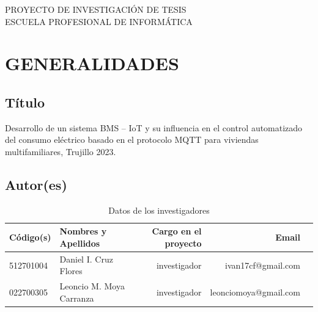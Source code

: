 \documentclass[a4paper, 12pt]{article}
\begin{document}
\begin{center}
\Large {PROYECTO DE INVESTIGACIÓN DE TESIS \\
\vskip 0.2cm
 ESCUELA PROFESIONAL DE INFORMÁTICA}
\end{center}
\vskip 1cm

\section{GENERALIDADES}



\subsection{Título}
Desarrollo de un sistema BMS – IoT y su influencia en el control automatizado del consumo eléctrico basado en el protocolo MQTT para viviendas multifamiliares, Trujillo 2023.

\subsection{Autor(es)}
\begin{table}[h!]
 \caption{\small{Datos de los investigadores}}
\begin{tabular}{llrrr} \toprule
{\bf Código(s)} & {\bf Nombres y Apellidos} & {\bf Cargo en el proyecto} & {\bf Email} \\ \midrule
512701004 & Daniel I. Cruz Flores & investigador  & ivan17cf@gmail.com \\
022700305    & Leoncio M. Moya Carranza & investigador  & leonciomoya@gmail.com            \\ \bottomrule
\end{tabular}
\end{table}
\end{document}
